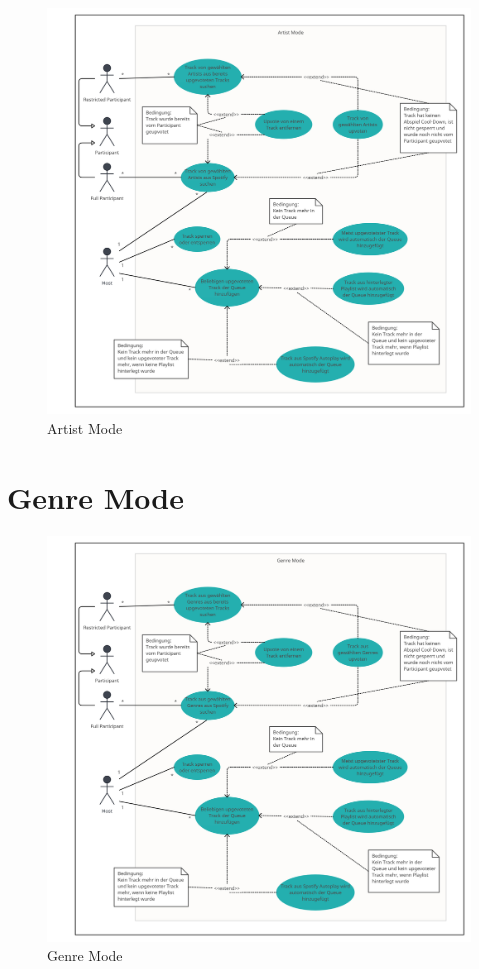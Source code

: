\documentclass[oneside, ngerman]{sdqtechreport}
\begin{document}
\begin{figure}[h]
    \includegraphics[width = 16cm]{LATEX/Pflichtenheft/GraphicDesigns/Use Case Artist Mode.png}
    \caption{Artist Mode}
    \label{fig:Use Case Artist Mode}
\end{figure}

\newpage

\section{Genre Mode}
\label{sec:Anwendungsfälle:Genre Mode}
\hypertarget{Genre Mode}{}

\begin{figure}[h]
    \includegraphics[width = 16cm]{LATEX/Pflichtenheft/GraphicDesigns/Use Case Genre Mode.png}
    \caption{Genre Mode}
    \label{fig:Use Case Genre Mode}
\end{figure}
\end{document}
